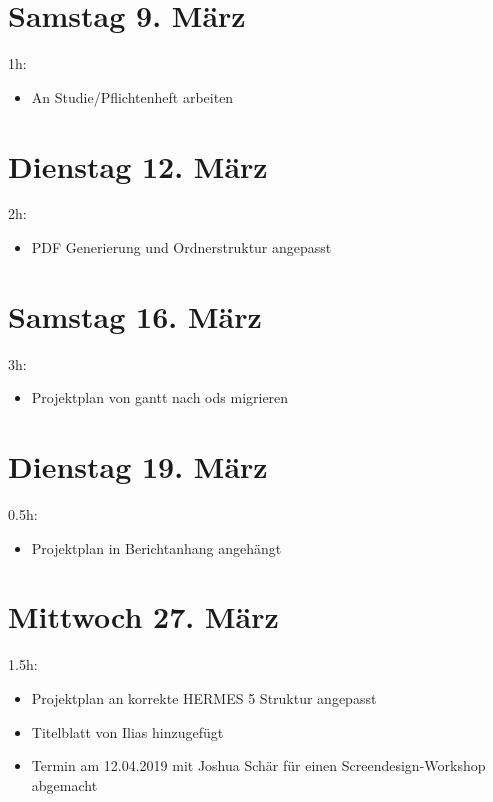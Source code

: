 \section{Samstag 9. März}\label{samstag-9.muxe4rz}

1h:

\begin{itemize}
  \tightlist
  \item
        An Studie/Pflichtenheft arbeiten
\end{itemize}

\section{Dienstag 12. März}\label{dienstag-12.muxe4rz}

2h:

\begin{itemize}
  \tightlist
  \item
        PDF Generierung und Ordnerstruktur angepasst
\end{itemize}

\section{Samstag 16. März}\label{samstag-16.muxe4rz}

3h:

\begin{itemize}
  \tightlist
  \item
        Projektplan von gantt nach ods migrieren
\end{itemize}

\section{Dienstag 19. März}\label{dienstag-19.muxe4rz}

0.5h:

\begin{itemize}
  \tightlist
  \item
        Projektplan in Berichtanhang angehängt
\end{itemize}

\section{Mittwoch 27. März}\label{mittwoch-27.muxe4rz}

1.5h:

\begin{itemize}
  \tightlist
  \item
        Projektplan an korrekte HERMES 5 Struktur angepasst
  \item
        Titelblatt von Ilias hinzugefügt
  \item
        Termin am 12.04.2019 mit Joshua Schär für einen Screendesign-Workshop abgemacht
\end{itemize}

